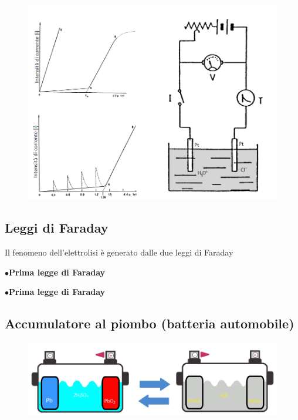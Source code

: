 \begin{figure}
    \centering
    \includegraphics[width=14cm]{immagini/elettrolisi.png}
\end{figure}
\subsection{Leggi di Faraday}
Il fenomeno dell'elettrolisi è generato dalle due leggi di Faraday

\vspace{0.2cm}$\bullet$\textbf{Prima legge di Faraday}

\vspace{0.2cm}$\bullet$\textbf{Prima legge di Faraday}
\subsection{Accumulatore al piombo (batteria automobile)}
\begin{figure}[H]
    \centering
    \includegraphics[width=15cm]{immagini/accumulatore_al_piombo.png}
\end{figure}
